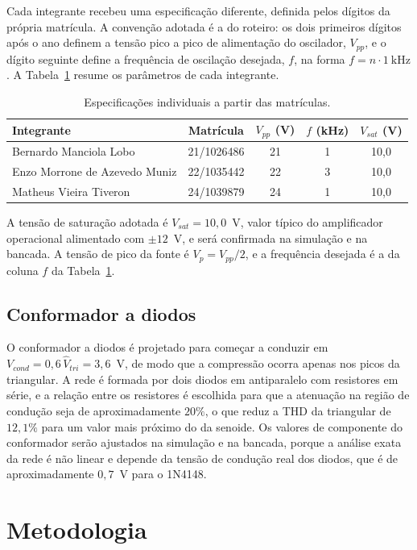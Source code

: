 \documentclass[11pt,a4paper]{article}
\begin{document}
Cada integrante recebeu uma especificação diferente, definida pelos dígitos da
própria matrícula. A convenção adotada é a do roteiro: os dois primeiros dígitos
após o ano definem a tensão pico a pico de alimentação do oscilador, $V_{pp}$, e
o dígito seguinte define a frequência de oscilação desejada, $f$, na forma
$f = n \cdot 1~\text{kHz}$. A Tabela~\ref{tab:spec_matriculas} resume os
parâmetros de cada integrante.
 
\begin{table}[htbp]
\centering
\caption{Especificações individuais a partir das matrículas.}
\label{tab:spec_matriculas}
\begin{tabular}{lcccc}
\hline
Integrante & Matrícula & $V_{pp}$ (V) & $f$ (kHz) & $V_{sat}$ (V) \\
\hline
Bernardo Manciola Lobo & 21/1026486 & 21 & 1 & 10{,}0 \\
Enzo Morrone de Azevedo Muniz & 22/1035442 & 22 & 3 & 10{,}0 \\
Matheus Vieira Tiveron & 24/1039879 & 24 & 1 & 10{,}0 \\
\hline
\end{tabular}
\end{table}
 
A tensão de saturação adotada é $V_{sat} = 10{,}0$~V, valor típico do
amplificador operacional alimentado com $\pm 12$~V, e será confirmada na
simulação e na bancada. A tensão de pico da fonte é $V_p = V_{pp}/2$, e a
frequência desejada é a da coluna $f$ da Tabela~\ref{tab:spec_matriculas}.
 
\subsection{Conformador a diodos}
\label{sec:projeto_conformador}
 
O conformador a diodos é projetado para começar a conduzir em
$V_{cond} = 0{,}6\,\hat V_{tri} = 3{,}6$~V, de modo que a compressão ocorra
apenas nos picos da triangular. A rede é formada por dois diodos em antiparalelo
com resistores em série, e a relação entre os resistores é escolhida para que a
atenuação na região de condução seja de aproximadamente $20\%$, o que reduz a
THD da triangular de $12{,}1\%$ para um valor mais próximo do da senoide. Os
valores de componente do conformador serão ajustados na simulação e na bancada,
porque a análise exata da rede é não linear e depende da tensão de condução real
dos diodos, que é de aproximadamente $0{,}7$~V para o 1N4148.

\section{Metodologia}
\end{document}
